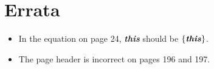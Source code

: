 \documentclass[letterpaper,12pt]{article}
\begin{document}
\thispagestyle{empty}
\section*{Errata}
\begin{itemize}
  \item In the equation on page 24, \textbf{\emph{this}} should be $\{ \textbf{\emph{this}} \}$.
  \item The page header is incorrect on pages 196 and 197.
\end{itemize}
\end{document}

